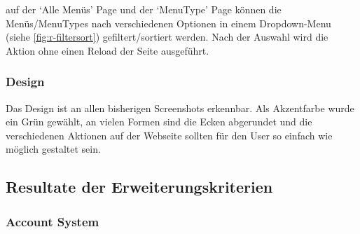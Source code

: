 auf der `Alle Menüs' Page und der `MenuType' Page können die Menüs/MenuTypes
nach verschiedenen Optionen in einem Dropdown-Menu (siehe
\ref{fig:r-filtersort}) gefiltert/sortiert werden. Nach der Auswahl wird die
Aktion ohne einen Reload der Seite ausgeführt.

\subsubsection*{Design}
Das Design ist an allen bisherigen Screenshots erkennbar. Als Akzentfarbe wurde
ein Grün gewählt, an vielen Formen sind die Ecken abgerundet und die
verschiedenen Aktionen auf der Webseite sollten für den User so einfach wie
möglich gestaltet sein.

\newpage

\subsection{Resultate der Erweiterungskriterien}

\subsubsection*{Account System}

